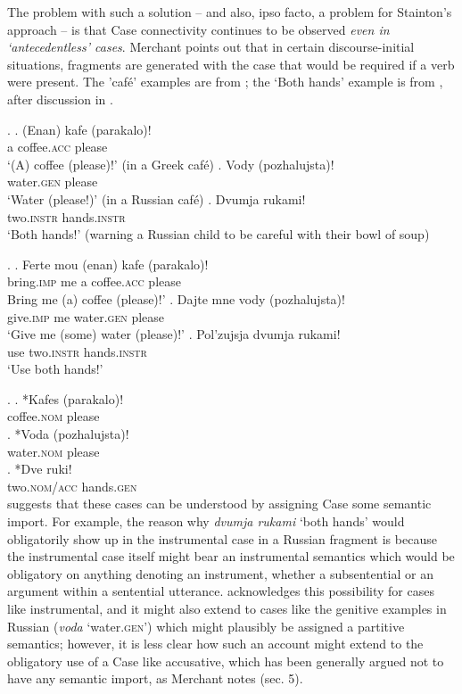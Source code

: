 \documentclass[doublespace]{umthesis}
\begin{document}
The problem with such a solution -- and also, ipso facto, a problem for Stainton's approach -- is that Case connectivity continues to be observed \emph{even in `antecedentless' cases}. Merchant points out that in certain discourse-initial situations, fragments are generated with the case that would be required if a verb were present. The 'caf\'e' examples are from \cite[(219, 220)]{Me04}; the `Both hands' example is from \cite[fn.~11]{Me10}, after discussion in \cite{St06book}.

\ex. 		\ag.  (Enan) kafe (parakalo)!\\
		a coffee.\textsc{acc} please\\
		`(A) coffee (please)!' (in a Greek caf\'e)
		\bg.  Vody (pozhalujsta)!\\
		water.\textsc{gen} please\\
		`Water (please!)' (in a Russian caf\'e)
		\bg.  Dvumja rukami!\\
		two.\textsc{instr} hands.\textsc{instr}\\
		`Both hands!' (warning a Russian child to be careful with their bowl of soup)
		
\ex. 		\ag. Ferte mou (enan) kafe (parakalo)!\\
			bring.\textsc{imp} me a coffee.\textsc{acc} please\\
			Bring me (a) coffee (please)!'
		\bg. Dajte mne vody (pozhalujsta)!\\
			give.\textsc{imp} me water.\textsc{gen} please\\
			`Give me (some) water (please)!'
		\bg. Pol'zujsja dvumja rukami!\\
			use two.\textsc{instr} hands.\textsc{instr}\\
			`Use both hands!'

\ex. 		\ag. *Kafes (parakalo)!\\
			coffee.\textsc{nom} please\\
		\bg. *Voda (pozhalujsta)!\\
			water.\textsc{nom} please\\
		\bg. *Dve ruki!\\
			two.\textsc{nom/acc} hands.\textsc{gen}\\

\cite[108f.]{St06book} suggests that these cases can be understood by assigning Case some semantic import. For example, the reason why {\it dvumja rukami} `both hands' would obligatorily show up in the instrumental case in a Russian fragment is because the instrumental case itself might bear an instrumental semantics which would be obligatory on anything denoting an instrument, whether a subsentential or an argument within a sentential utterance. \cite{Me10} acknowledges this possibility for cases like instrumental, and it might also extend to cases like the genitive examples in Russian ({\it voda} `water.\textsc{gen}') which might plausibly be assigned a partitive semantics; however, it is less clear how such an account might extend to the obligatory use of a Case like accusative, which has been generally argued not to have any semantic import, as Merchant notes (sec. 5).
\end{document}
